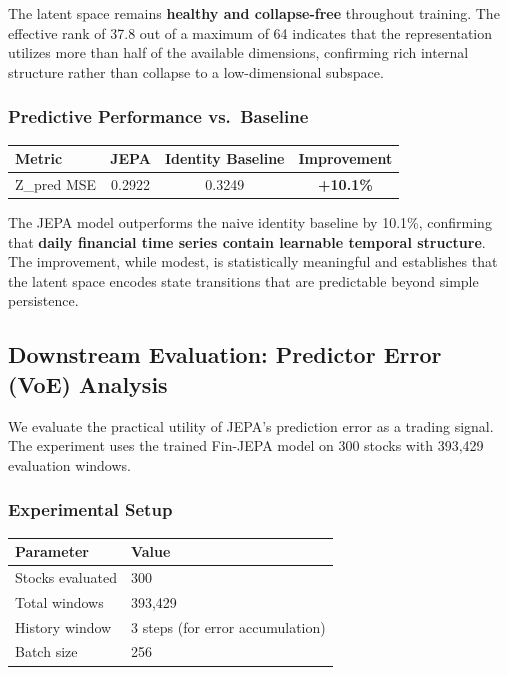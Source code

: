 \documentclass[11pt]{article}
\begin{document}
The latent space remains \textbf{healthy and collapse-free} throughout training. The effective rank of 37.8 out of a maximum of 64 indicates that the representation utilizes more than half of the available dimensions, confirming rich internal structure rather than collapse to a low-dimensional subspace.

\subsubsection{Predictive Performance vs.\ Baseline}

\begin{center}
\begin{tabular}{lccc}
\toprule
Metric & JEPA & Identity Baseline & Improvement \\
\midrule
Z\_pred MSE & 0.2922 & 0.3249 & \textbf{+10.1\%} \\
\bottomrule
\end{tabular}
\end{center}

The JEPA model outperforms the naive identity baseline by 10.1\%, confirming that \textbf{daily financial time series contain learnable temporal structure}. The improvement, while modest, is statistically meaningful and establishes that the latent space encodes state transitions that are predictable beyond simple persistence.

\subsection{Downstream Evaluation: Predictor Error (VoE) Analysis}

We evaluate the practical utility of JEPA's prediction error as a trading signal. The experiment uses the trained Fin-JEPA model on 300 stocks with 393,429 evaluation windows.

\subsubsection{Experimental Setup}

\begin{center}
\begin{tabular}{ll}
\toprule
Parameter & Value \\
\midrule
Stocks evaluated & 300 \\
Total windows & 393,429 \\
History window & 3 steps (for error accumulation) \\
Batch size & 256 \\
\bottomrule
\end{tabular}
\end{center}
\end{document}
